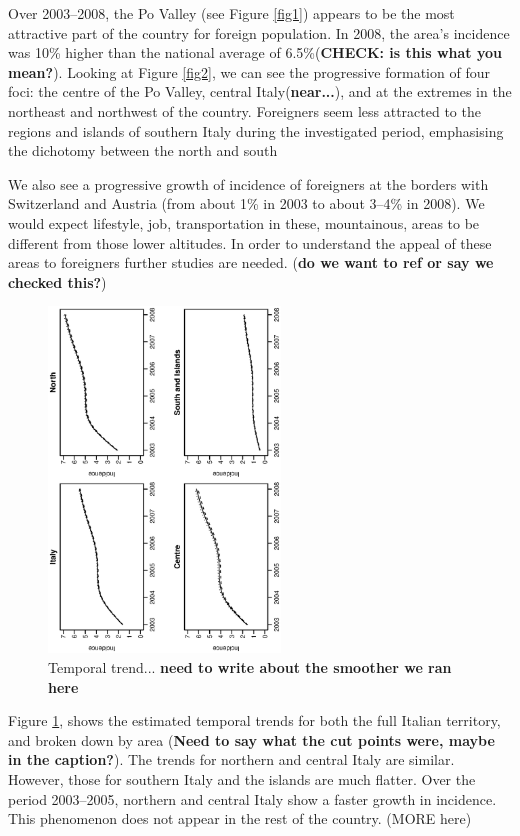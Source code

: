\documentclass[10pt]{article}
\theoremstyle{definition}
\theoremstyle{plain}
\begin{document}
Over 2003--2008, the Po Valley (see Figure \ref{fig1}) appears to be the most attractive part of the country for foreign population. In 2008, the area's incidence was 10\% higher than the national average of 6.5\%(\textbf{CHECK: is this what you mean?}). Looking at Figure \ref{fig2}, we can see the progressive formation of four foci: the centre of the Po Valley, central Italy(\textbf{near...}), and at the extremes in the northeast and northwest of the country. Foreigners seem less attracted to the regions and islands of southern Italy during the investigated period, emphasising the dichotomy between the north and south

We also see a progressive growth of incidence of foreigners at the borders with Switzerland and Austria (from about 1\% in 2003 to about 3--4\% in 2008). We  would expect lifestyle, job, transportation in these, mountainous, areas to be different from those lower altitudes. In order to understand the appeal of these areas to foreigners further studies are needed. (\textbf{do we want to ref or say we checked this?})

\begin{figure}[tbp]
	\centering
		\includegraphics[width=0.55\textwidth, angle=270]{trends.ps}
	\caption{Temporal trend... \textbf{need to write about the smoother we ran here}}
	\label{trends}
\end{figure}

Figure \ref{trends}, shows the estimated temporal trends for both the full Italian territory, and broken down by area (\textbf{Need to say what the cut points were, maybe in the caption?}). The trends for northern and central Italy are similar. However, those for southern Italy and the islands are much flatter. Over the period 2003--2005, northern and central Italy show a faster growth in incidence. This phenomenon does not appear in the rest of the country. (\textsf{MORE here})
\end{document}
